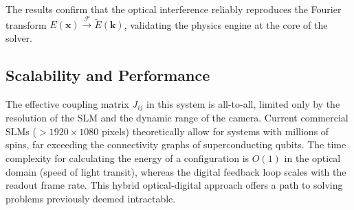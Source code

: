 The results confirm that the optical interference reliably reproduces the Fourier transform $E(\mathbf{x}) \xrightarrow{\mathcal{F}} \tilde{E}(\mathbf{k})$, validating the physics engine at the core of the solver.

\subsection{Scalability and Performance}
The effective coupling matrix $J_{ij}$ in this system is all-to-all, limited only by the resolution of the SLM and the dynamic range of the camera. Current commercial SLMs ($>1920 \times 1080$ pixels) theoretically allow for systems with millions of spins, far exceeding the connectivity graphs of superconducting qubits. The time complexity for calculating the energy of a configuration is $O(1)$ in the optical domain (speed of light transit), whereas the digital feedback loop scales with the readout frame rate. This hybrid optical-digital approach offers a path to solving problems previously deemed intractable.
